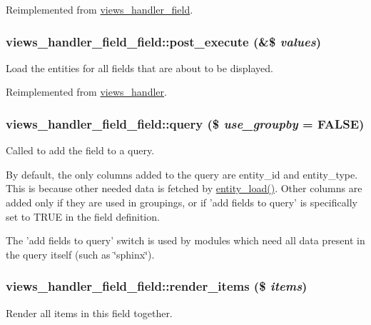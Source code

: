 Reimplemented from \hyperlink{classviews__handler__field_a0435d161922b7b4b84f02a2e79bb947a}{views\_\-handler\_\-field}.\hypertarget{classviews__handler__field__field_ad28ba30ac4cccf41187e702258883681}{
\subsubsection[{post\_\-execute}]{\setlength{\rightskip}{0pt plus 5cm}views\_\-handler\_\-field\_\-field::post\_\-execute (\&\$ {\em values})}}
\label{classviews__handler__field__field_ad28ba30ac4cccf41187e702258883681}
Load the entities for all fields that are about to be displayed. 

Reimplemented from \hyperlink{classviews__handler_a78896f02cc58523ccc369d242d92c6a1}{views\_\-handler}.\hypertarget{classviews__handler__field__field_a17122cc581a8411708059011a6db180d}{
\subsubsection[{query}]{\setlength{\rightskip}{0pt plus 5cm}views\_\-handler\_\-field\_\-field::query (\$ {\em use\_\-groupby} = {\ttfamily FALSE})}}
\label{classviews__handler__field__field_a17122cc581a8411708059011a6db180d}
Called to add the field to a query.

By default, the only columns added to the query are entity\_\-id and entity\_\-type. This is because other needed data is fetched by \hyperlink{common_8inc_a78b89cf93f9710a68d02f86adccf1898}{entity\_\-load()}. Other columns are added only if they are used in groupings, or if 'add fields to query' is specifically set to TRUE in the field definition.

The 'add fields to query' switch is used by modules which need all data present in the query itself (such as \char`\"{}sphinx\char`\"{}). \hypertarget{classviews__handler__field__field_aa2206b6422041cc4e82c8091a5c28f15}{
\subsubsection[{render\_\-items}]{\setlength{\rightskip}{0pt plus 5cm}views\_\-handler\_\-field\_\-field::render\_\-items (\$ {\em items})}}
\label{classviews__handler__field__field_aa2206b6422041cc4e82c8091a5c28f15}
Render all items in this field together.


